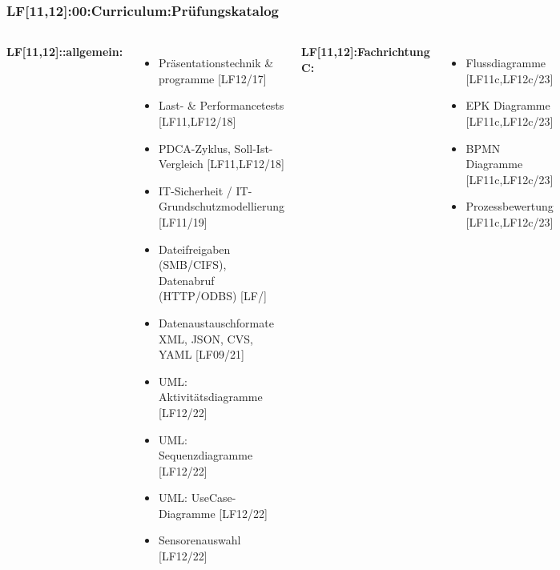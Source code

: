 

\begin{frame}
  \frametitle{LF[11,12]:00:Curriculum:Prüfungskatalog}
  \begin{tiny}
  \begin{columns}[T]
    \textbf{LF[11,12]::allgemein:}
    \begin{itemize}
      \item[\faSquareO] Präsentationstechnik \& programme [LF12/17]
      \item[\faSquareO] Last- \& Performancetests [LF11,LF12/18]
      \item[\faSquareO] PDCA-Zyklus, Soll-Ist-Vergleich [LF11,LF12/18]
      \item[\faSquareO] IT-Sicherheit / IT-Grundschutzmodellierung [LF11/19]
      \item[\faSquareO] Dateifreigaben (SMB/CIFS), Datenabruf (HTTP/ODBS)  [LF/]
      \item[\faSquareO] Datenaustauschformate XML, JSON, CVS, YAML [LF09/21]
      \item[\faSquareO] UML: Aktivitätsdiagramme [LF12/22]
      \item[\faSquareO] UML: Sequenzdiagramme [LF12/22]
      \item[\faSquareO] UML: UseCase-Diagramme [LF12/22]
      \item[\faSquareO] Sensorenauswahl [LF12/22]
    \end{itemize}
    \textbf{LF[11,12]:Fachrichtung C:}
    \begin{itemize}
      \item[\faSquareO] Flussdiagramme [LF11c,LF12c/23]
      \item[\faSquareO] EPK Diagramme [LF11c,LF12c/23]
      \item[\faSquareO] BPMN Diagramme [LF11c,LF12c/23]
      \item[\faSquareO] Prozessbewertung [LF11c,LF12c/23]

\end{itemize}
\end{columns}
\end{tiny}
\end{frame}
